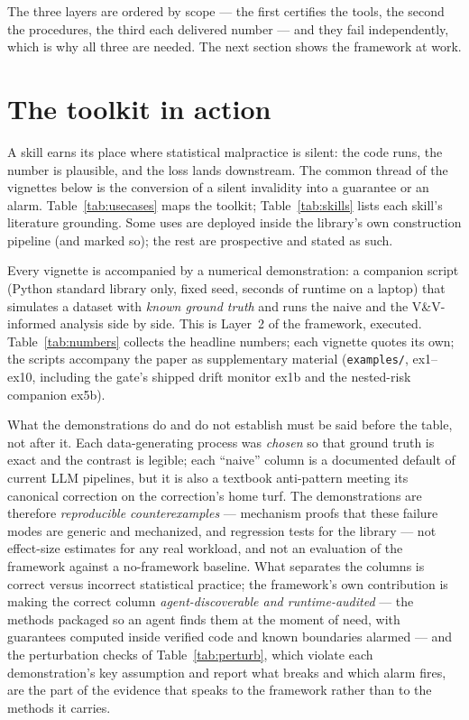 \documentclass[11pt,a4paper]{article}
\begin{document}
The three layers are ordered by scope --- the first certifies the tools,
the second the procedures, the third each delivered number --- and they
fail independently, which is why all three are needed. The next section
shows the framework at work.

\section{The toolkit in action}\label{sec:toolkit}

A skill earns its place where statistical malpractice is silent: the code
runs, the number is plausible, and the loss lands downstream. The common
thread of the vignettes below is the conversion of a silent invalidity into
a guarantee or an alarm. Table~\ref{tab:usecases} maps the toolkit;
Table~\ref{tab:skills} lists each skill's literature grounding. Some uses
are deployed inside the library's own construction pipeline (and marked
so); the rest are prospective and stated as such.

Every vignette is accompanied by a numerical demonstration: a companion
script (Python standard library only, fixed seed, seconds of runtime on a
laptop) that simulates a dataset with \emph{known ground truth} and runs
the naive and the V\&V-informed analysis side by side. This is Layer~2 of
the framework, executed. Table~\ref{tab:numbers} collects the headline
numbers; each vignette quotes its own; the scripts accompany the paper as
supplementary material (\texttt{examples/}, ex1--ex10, including the
gate's shipped drift monitor ex1b and the nested-risk companion ex5b).

What the demonstrations do and do not establish must be said before the
table, not after it. Each data-generating process was \emph{chosen} so
that ground truth is exact and the contrast is legible; each ``naive''
column is a documented default of current LLM pipelines, but it is also a
textbook anti-pattern meeting its canonical correction on the correction's
home turf. The demonstrations are therefore \emph{reproducible
counterexamples} --- mechanism proofs that these failure modes are generic
and mechanized, and regression tests for the library --- not effect-size
estimates for any real workload, and not an evaluation of the framework
against a no-framework baseline. What separates the columns is correct
versus incorrect statistical practice; the framework's own contribution is
making the correct column \emph{agent-discoverable and runtime-audited}
--- the methods packaged so an agent finds them at the moment of need,
with guarantees computed inside verified code and known boundaries
alarmed --- and the perturbation checks of Table~\ref{tab:perturb}, which
violate each demonstration's key assumption and report what breaks and
which alarm fires, are the part of the evidence that speaks to the
framework rather than to the methods it carries.
\end{document}
